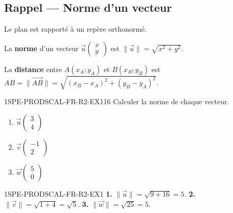 

\subsection*{Rappel — Norme d'un vecteur}

Le plan est rapporté à un repère orthonormé.

La \textbf{norme} d'un vecteur $\vec{u}\begin{pmatrix} x \\ y \end{pmatrix}$ est $\|\vec{u}\| = \sqrt{x^2 + y^2}$.

La \textbf{distance} entre $A(x_A; y_A)$ et $B(x_B; y_B)$ est $AB = \|\overrightarrow{AB}\| = \sqrt{(x_B-x_A)^2 + (y_B-y_A)^2}$.

\begin{exercice}{1SPE-PRODSCAL-FR-R2-EX1}{1}{6}
Calculer la norme de chaque vecteur.
\begin{enumerate}
  \item $\vec{u}\begin{pmatrix} 3 \\ 4 \end{pmatrix}$
  \item $\vec{v}\begin{pmatrix} -1 \\ 2 \end{pmatrix}$
  \item $\vec{w}\begin{pmatrix} 5 \\ 0 \end{pmatrix}$
\end{enumerate}
\end{exercice}


\begin{corrige}{1SPE-PRODSCAL-FR-R2-EX1}
\textbf{1.} $\|\vec{u}\| = \sqrt{9+16} = 5$.
\textbf{2.} $\|\vec{v}\| = \sqrt{1+4} = \sqrt{5}$.
\textbf{3.} $\|\vec{w}\| = \sqrt{25} = 5$.
\end{corrige}

